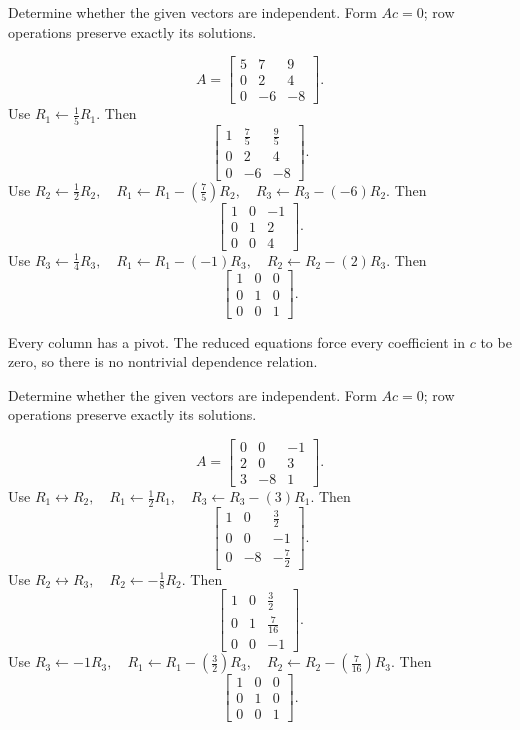 
\goal Determine whether the given vectors are independent. Form $Ac=0$; row operations preserve exactly its solutions.

\[ A=\begin{bmatrix}5 & 7 & 9\\0 & 2 & 4\\0 & -6 & -8\end{bmatrix}.\]
Use $R_{1}\leftarrow \frac{1}{5}R_{1}$. Then
\[ \begin{bmatrix}1 & \frac{7}{5} & \frac{9}{5}\\0 & 2 & 4\\0 & -6 & -8\end{bmatrix}.\]
Use $R_{2}\leftarrow \frac{1}{2}R_{2},\quad R_{1}\leftarrow R_{1}-(\frac{7}{5})R_{2},\quad R_{3}\leftarrow R_{3}-(-6)R_{2}$. Then
\[ \begin{bmatrix}1 & 0 & -1\\0 & 1 & 2\\0 & 0 & 4\end{bmatrix}.\]
Use $R_{3}\leftarrow \frac{1}{4}R_{3},\quad R_{1}\leftarrow R_{1}-(-1)R_{3},\quad R_{2}\leftarrow R_{2}-(2)R_{3}$. Then
\[ \begin{bmatrix}1 & 0 & 0\\0 & 1 & 0\\0 & 0 & 1\end{bmatrix}.\]

Every column has a pivot. The reduced equations force every coefficient in $c$ to be zero, so there is no nontrivial dependence relation.



\goal Determine whether the given vectors are independent. Form $Ac=0$; row operations preserve exactly its solutions.

\[ A=\begin{bmatrix}0 & 0 & -1\\2 & 0 & 3\\3 & -8 & 1\end{bmatrix}.\]
Use $R_{1}\leftrightarrow R_{2},\quad R_{1}\leftarrow \frac{1}{2}R_{1},\quad R_{3}\leftarrow R_{3}-(3)R_{1}$. Then
\[ \begin{bmatrix}1 & 0 & \frac{3}{2}\\0 & 0 & -1\\0 & -8 & - \frac{7}{2}\end{bmatrix}.\]
Use $R_{2}\leftrightarrow R_{3},\quad R_{2}\leftarrow - \frac{1}{8}R_{2}$. Then
\[ \begin{bmatrix}1 & 0 & \frac{3}{2}\\0 & 1 & \frac{7}{16}\\0 & 0 & -1\end{bmatrix}.\]
Use $R_{3}\leftarrow -1R_{3},\quad R_{1}\leftarrow R_{1}-(\frac{3}{2})R_{3},\quad R_{2}\leftarrow R_{2}-(\frac{7}{16})R_{3}$. Then
\[ \begin{bmatrix}1 & 0 & 0\\0 & 1 & 0\\0 & 0 & 1\end{bmatrix}.\]

